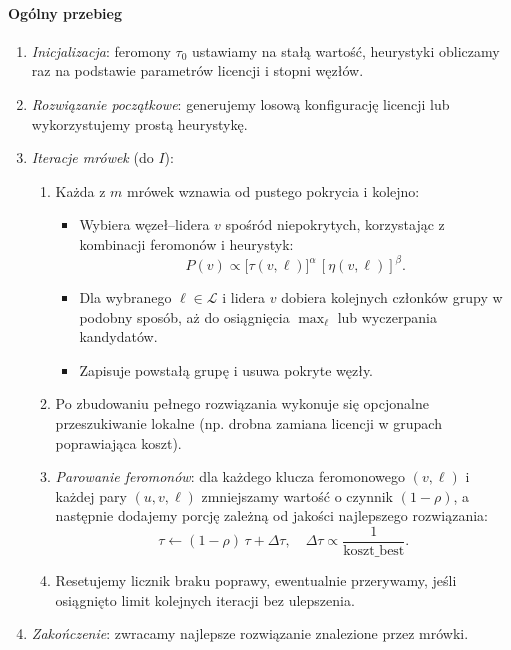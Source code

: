 \paragraph{Ogólny przebieg}  
\begin{enumerate}
  \item \emph{Inicjalizacja}: feromony $\tau_0$ ustawiamy na stałą wartość, heurystyki obliczamy raz na podstawie parametrów licencji i stopni węzłów.
  \item \emph{Rozwiązanie początkowe}: generujemy losową konfigurację licencji lub wykorzystujemy prostą heurystykę.
  \item \emph{Iteracje mrówek} (do $I$):
    \begin{enumerate}
      \item Każda z $m$ mrówek wznawia od pustego pokrycia i kolejno:
        \begin{itemize}
          \item Wybiera węzeł–lidera $v$ spośród niepokrytych, korzystając z kombinacji feromonów i heurystyk:  
            \[
              P(v)\propto \bigl[\tau(v,\ell)\bigr]^\alpha\,[\eta(v,\ell)]^\beta.
            \]
          \item Dla wybranego $\ell\in\mathcal{L}$ i lidera $v$ dobiera kolejnych członków grupy w podobny sposób, aż do osiągnięcia $\max_\ell$ lub wyczerpania kandydatów.
          \item Zapisuje powstałą grupę i usuwa pokryte węzły.
        \end{itemize}
      \item Po zbudowaniu pełnego rozwiązania wykonuje się opcjonalne przeszukiwanie lokalne (np. drobna zamiana licencji w grupach poprawiająca koszt).
      \item \emph{Parowanie feromonów}: dla każdego klucza feromonowego $(v,\ell)$ i każdej pary $(u,v,\ell)$ zmniejszamy wartość o czynnik $(1-\rho)$, a następnie dodajemy porcję zależną od jakości najlepszego rozwiązania:
        \[
          \tau \leftarrow (1-\rho)\,\tau + \Delta\tau,\quad
          \Delta\tau \propto \frac{1}{\text{koszt\_best}}.
        \]
      \item Resetujemy licznik braku poprawy, ewentualnie przerywamy, jeśli osiągnięto limit kolejnych iteracji bez ulepszenia.
    \end{enumerate}
  \item \emph{Zakończenie}: zwracamy najlepsze rozwiązanie znalezione przez mrówki.
\end{enumerate}

